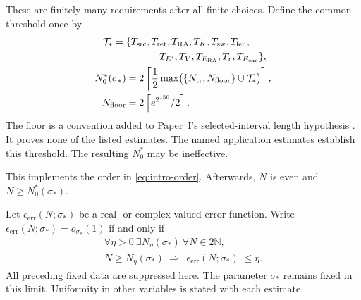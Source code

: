 These are finitely many requirements after all finite choices.
Define the common threshold once by
\begin{equation}\label{eq:not-common-threshold}
\begin{aligned}
 \mathcal T_*={}&\{T_{\mathrm{src}},T_{\mathrm{ret}},T_{\mathrm{RA}},
 T_K,T_{\mathrm{sw}},T_{\mathrm{len}},\\
 &\hspace{12mm}T_{E'},T_V,T_{E_{\mathrm{RA}}},T_r,T_{E_{\mathrm{exc}}}\},\\
 N_0^*(\sigma_*)&=2\left\lceil\frac12
 \max\bigl(\{N_{\mathrm{tr}},N_{\mathrm{floor}}\}\cup\mathcal T_*\bigr)
 \right\rceil,\\
 N_{\mathrm{floor}}&=2\left\lceil e^{2^{150}}/2\right\rceil.
\end{aligned}
\end{equation}
The floor is a convention added to Paper~I's
selected-interval length hypothesis
\cite[\S3.2, length hypothesis preceding (3.12)]{PaperI}. It proves none of
the listed estimates. The named application estimates establish this
threshold. The resulting $N_0^*$ may be ineffective.

This implements the order in \eqref{eq:intro-order}.
Afterwards, \(N\) is even and $N\ge N_0^*(\sigma_*)$.

Let \(\epsilon_{\mathrm{err}}(N;\sigma_*)\) be a real- or complex-valued error function.
Write \(\epsilon_{\mathrm{err}}(N;\sigma_*)=o_{\sigma_*}(1)\) if and only if
\begin{equation}\label{eq:not-little-o}
\begin{gathered}
 \forall\eta>0\ \exists N_\eta(\sigma_*)\ \forall N\in2\mathbb N,\\
 N\ge N_\eta(\sigma_*)\ \Longrightarrow\ |\epsilon_{\mathrm{err}}(N;\sigma_*)|\le\eta.
\end{gathered}
\end{equation}
All preceding fixed data are suppressed here.
The parameter \(\sigma_*\) remains fixed in this limit.
Uniformity in other variables is stated with each estimate.
